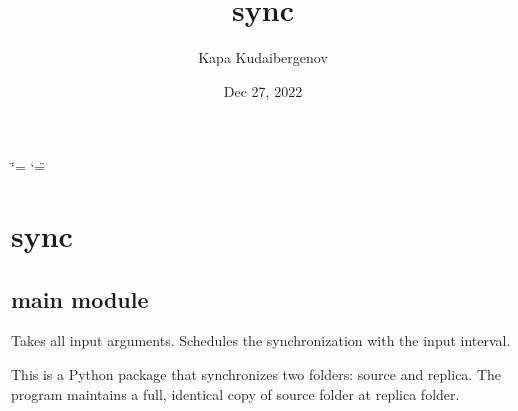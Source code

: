 \documentclass[letterpaper,10pt,english]{sphinxmanual}
\title{sync}
\date{Dec 27, 2022}
\author{Kapa Kudaibergenov}
\begin{document}
\ifdefined\shorthandoff
  \ifnum\catcode`\=\string=\active\shorthandoff{=}\fi
  \ifnum\catcode`\"=\active{}\fi
\fi

\pagestyle{empty}
\sphinxmaketitle
\pagestyle{plain}
\sphinxtableofcontents
\pagestyle{normal}
\label{\detokenize{index::doc}}


\sphinxstepscope


\chapter{sync}
\label{\detokenize{modules:sync}}\label{\detokenize{modules::doc}}
\sphinxstepscope


\section{main module}
\label{\detokenize{main:module-main}}\label{\detokenize{main:main-module}}\label{\detokenize{main::doc}}
\sphinxAtStartPar
Takes all input arguments. Schedules the synchronization with the input interval.

\sphinxAtStartPar
This is a Python package that synchronizes two folders: source and replica. The
program maintains a full, identical copy of source folder at replica folder.
\end{document}

